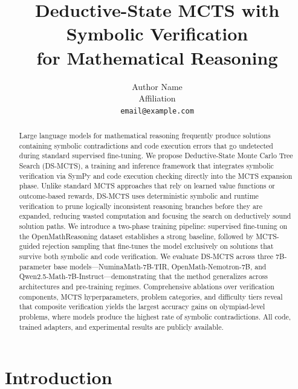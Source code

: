 \documentclass[11pt,a4paper]{article}
\title{Deductive-State MCTS with Symbolic Verification\\for Mathematical Reasoning}
\author{
    Author Name\\
    Affiliation\\
    \texttt{email@example.com}
}
\date{}
\begin{document}
\maketitle

\begin{abstract}

Large language models for mathematical reasoning frequently produce solutions
containing symbolic contradictions and code execution errors that go undetected
during standard supervised fine-tuning. We propose Deductive-State Monte Carlo
Tree Search (DS-MCTS), a training and inference framework that integrates
symbolic verification via SymPy and code execution checking directly into the
MCTS expansion phase. Unlike standard MCTS approaches that rely on learned value
functions or outcome-based rewards, DS-MCTS uses deterministic symbolic and
runtime verification to prune logically inconsistent reasoning branches before
they are expanded, reducing wasted computation and focusing the search on
deductively sound solution paths. We introduce a two-phase training pipeline:
supervised fine-tuning on the OpenMathReasoning dataset establishes a strong
baseline, followed by MCTS-guided rejection sampling that fine-tunes the model
exclusively on solutions that survive both symbolic and code verification. We
evaluate DS-MCTS across three 7B-parameter base models---NuminaMath-7B-TIR,
OpenMath-Nemotron-7B, and Qwen2.5-Math-7B-Instruct---demonstrating that the
method generalizes across architectures and pre-training regimes. Comprehensive
ablations over verification components, MCTS hyperparameters, problem
categories, and difficulty tiers reveal that composite verification yields the
largest accuracy gains on olympiad-level problems, where models produce the
highest rate of symbolic contradictions. All code, trained adapters, and
experimental results are publicly available.

\end{abstract}


\section{Introduction}
\label{sec:introduction}
\end{document}
